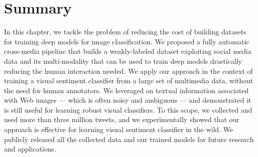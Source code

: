 
\section{Summary}
\label{sec:vsa:conclusion}

In this chapter, we tackle the problem of reducing the cost of building datasets for training deep models for image classification.
We proposed a fully automatic cross-media pipeline that builds a weakly-labeled dataset exploiting social media data and its multi-modality that can be used to train deep models drastically reducing the human interaction needed.
We apply our approach in the context of training a visual sentiment classifier from a large set of multimedia data, without the need for human annotators.
We leveraged on textual information associated with Web images --- which is often noisy and ambiguous --- and demonstrated it is still useful for learning robust visual classifiers.
To this scope, we collected and used more than three million tweets, and we experimentally showed that our approach is effective for learning visual sentiment classifier in the wild.
We publicly released all the collected data and our trained models for future research and applications.